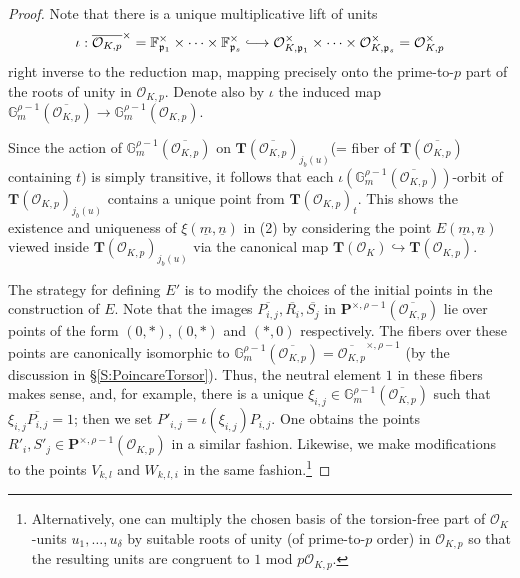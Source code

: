 \documentclass[11pt,oneside]{amsart}
\theoremstyle{plain}
\theoremstyle{definition}
\def\G{{\bf G}}
\def\TT{\mathbf{T}}
\def\G{\mathbb{G}}
\def\P{\mathbf{P}}
\def\oh{\mathcal{O}}
\def\longhookrightarrow{\lhook\joinrel\longrightarrow}
\begin{document}
\begin{proof}
Note that there is a unique multiplicative lift of units 
$$\iota:{\overline{\oh_{K, p}}^{\times} = \mathbb{F}_{\mathfrak{p}_1}^\times \times \dots \times \mathbb{F}_{\mathfrak{p}_s}^\times \longhookrightarrow \oh_{K, \mathfrak{p}_1}^\times\times \dots \times \oh_{K, \mathfrak{p}_s}^\times=\oh_{K, p}^{\times}}$$
right inverse to the reduction map, mapping precisely onto the prime-to-$p$ part of the roots of unity in $\oh_{K, p}$. 
Denote also by $\iota$ the induced map $\G_m^{\rho-1}(\overline{\oh_{K, p}})\rightarrow \G_m^{\rho-1}(\oh_{K, p})$. %

Since the action of $\G_m^{\rho-1}(\overline{\oh_{K, p}})$ on $\TT(\overline{\oh_{K, p}})_{j_b(u)}$(= fiber of ${\TT(\overline{\oh_{K, p}})}$ containing $t$) is simply transitive, it follows that each $\iota(\G_m^{\rho-1}(\overline{\oh_{K, p}}))$-orbit of $\TT(\oh_{K, p})_{j_b(u)}$ contains a unique point from $\TT(\oh_{K, p})_t$. This shows the existence and uniqueness of $\xi(\underline{m}, \underline{n})$ in (2) by considering the point $E(\underline{m}, \underline{n})$ viewed inside  $\TT(\oh_{K, p})_{j_b(u)}$ via the canonical map ${\TT(\oh_K) \hookrightarrow \TT(\oh_{K, p})}$. 

The strategy for defining $E'$ is to modify the choices of the initial points in the construction of $E$. Note that the images $\overline{P_{i, j}}, \overline{R_i}, \overline{S_j}$ in ${\P^{\times, \rho-1}(\overline{\oh_{K, p}})}$ lie over points of the form $(0, *), (0, *)$ and $(*, 0)$ respectively. The fibers over these points are canonically isomorphic to $\G_m^{\rho-1}(\overline{\oh_{K, p}})=\overline{\oh_{K, p}}^{\times, \rho-1}$ (by the discussion in \S \ref{S:PoincareTorsor}). Thus, the neutral element $1$ in these fibers makes sense, and, for example, there is a unique $\xi_{i, j} \in \G_m^{\rho-1}(\overline{\oh_{K, p}})$  such that $\xi_{i, j}\overline{P_{i, j}}=1$; then we set $P'_{i, j}=\iota(\xi_{i, j})P_{i, j}.$ One obtains the points $R'_i, S'_j \in \P^{\times, \rho-1}(\oh_{K, p})$ in a similar fashion. Likewise, we make modifications to the points $V_{k, l}$ and $W_{k, l, i}$ in the same fashion.\footnote{Alternatively, one can multiply the chosen basis of the torsion-free part of $\oh_K$-units $u_1, \dots, u_{\delta}$ by suitable roots of unity (of prime-to-$p$ order) in $\oh_{K, p}$ so that the resulting units are congruent to $1$ mod $p\oh_{K, p}$. }


\end{proof}
\end{document}
